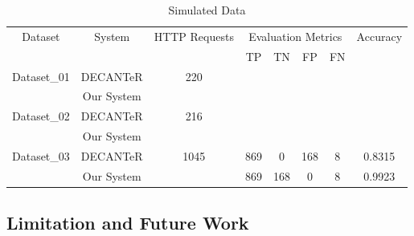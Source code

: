 \begin{table*}[!h]
\centering
\caption{Simulated Data}
\label{tbl:db_03}
\begin{tabular}{|c|c|c|c|c|c|c|c|}
\hline
\multirow{2}{*}{Dataset}     & \multirow{2}{*}{System} & \multirow{2}{*}{HTTP Requests} & \multicolumn{4}{c|}{Evaluation Metrics} & \multirow{2}{*}{Accuracy} \\ \cline{4-7}
                             &                         &                                & TP       & TN       & FP       & FN     &                           \\ \hline
\multirow{2}{*}{Dataset\_01} & DECANTeR \cite{bortolameotti2017decanter}                & \multirow{2}{*}{220}           &          &          &          &        &                           \\ \cline{2-2} \cline{4-8} 
                             & Our System              &                                &          &          &          &        &                           \\ \hline
\multirow{2}{*}{Dataset\_02} & DECANTeR \cite{bortolameotti2017decanter}                & \multirow{2}{*}{216}           &          &          &          &        &                           \\ \cline{2-2} \cline{4-8} 
                             & Our System              &                                &          &          &          &        &                           \\ \hline
\multirow{2}{*}{Dataset\_03} & DECANTeR \cite{bortolameotti2017decanter}                & \multirow{2}{*}{1045}          & 869      & 0        & 168      & 8      & 0.8315                    \\ \cline{2-2} \cline{4-8} 
                             & Our System              &                                & 869      & 168      & 0        & 8      & 0.9923                    \\ \hline
\end{tabular}
\end{table*}


\subsection{Limitation and Future Work}
